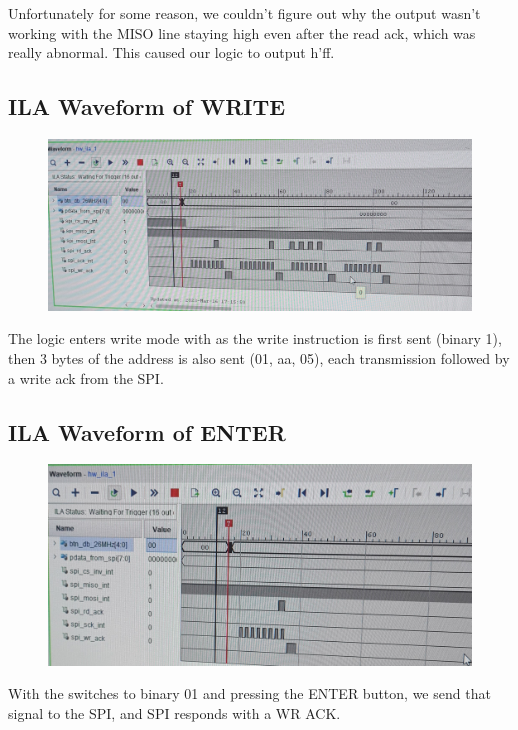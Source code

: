 \documentclass[11pt]{report}
\begin{document}
Unfortunately for some reason, we couldn't figure out why the output wasn't working with the MISO line staying high even after the read ack, which was really abnormal. This caused our logic to output h'ff.

\subsection*{ILA Waveform of WRITE}
\begin{figure}[H]
    \includegraphics[angle=-90,origin=c,width=\columnwidth]{Assets/ILA_write.jpeg}
\end{figure}

The logic enters write mode with as the write instruction is first sent (binary 1), then 3 bytes of the address is also sent (01, aa, 05), each transmission followed by a write ack from the SPI. 

\subsection*{ILA Waveform of ENTER}
\begin{figure}[H]
    \includegraphics[angle=-90,origin=c,width=\columnwidth]{Assets/ILA_enter.jpeg}
\end{figure}

With the switches to binary 01 and pressing the ENTER button, we send that signal to the SPI, and SPI responds with a WR ACK.
\end{document}
